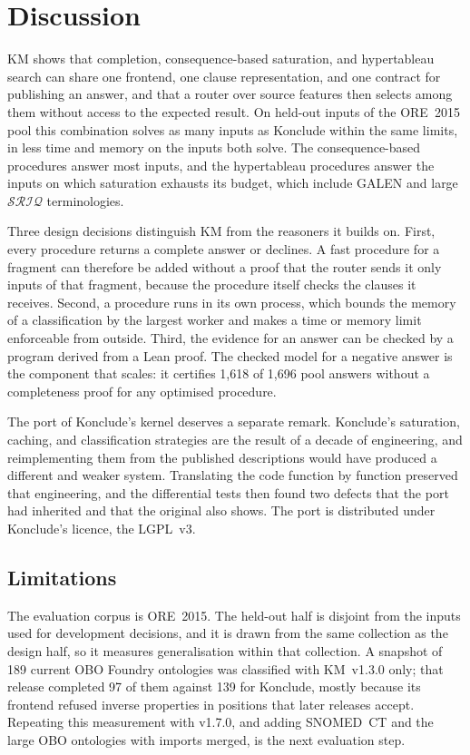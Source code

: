 \section{Discussion}
\label{sec:discussion}

KM shows that completion, consequence-based saturation, and hypertableau search
can share one frontend, one clause representation, and one contract for
publishing an answer, and that a router over source features then selects among
them without access to the expected result.  On held-out inputs of the
ORE~2015 pool this combination solves as many inputs as Konclude within the
same limits, in less time and memory on the inputs both solve.  The
consequence-based procedures answer most inputs, and the hypertableau
procedures answer the inputs on which saturation exhausts its budget, which
include GALEN and large $\mathcal{SRIQ}$ terminologies.  

Three design decisions distinguish KM from the reasoners it builds on.  First,
every procedure returns a complete answer or declines.  A fast procedure for a
fragment can therefore be added without a proof that the router sends it only
inputs of that fragment, because the procedure itself checks the clauses it
receives.  Second, a procedure runs in its own process, which bounds the memory
of a classification by the largest worker and makes a time or memory limit
enforceable from outside.  Third, the evidence for an answer can be checked
by a program derived from a Lean proof.  The checked model for a negative
answer is the component that scales: it certifies 1,618 of 1,696 pool answers
without a completeness proof for any optimised procedure.

The port of Konclude's kernel deserves a separate remark.  Konclude's
saturation, caching, and classification strategies are the result of a decade
of engineering, and reimplementing them from the published descriptions would
have produced a different and weaker system.  Translating the code function by
function preserved that engineering, and the differential tests then found two
defects that the port had inherited and that the original also shows.  The
port is distributed under Konclude's licence, the LGPL~v3.

\subsection{Limitations}
\label{sec:limitations}

The evaluation corpus is ORE~2015.  The held-out half is disjoint from the
inputs used for development decisions, and it is drawn from the same
collection as the design half, so it measures generalisation within that
collection.  A snapshot of 189 current OBO Foundry ontologies was classified
with KM~v1.3.0 only; that release completed 97 of them against 139 for
Konclude, mostly because its frontend refused inverse properties in positions
that later releases accept.  Repeating this measurement with v1.7.0, and
adding SNOMED~CT and the large OBO ontologies with imports merged, is the next
evaluation step.

